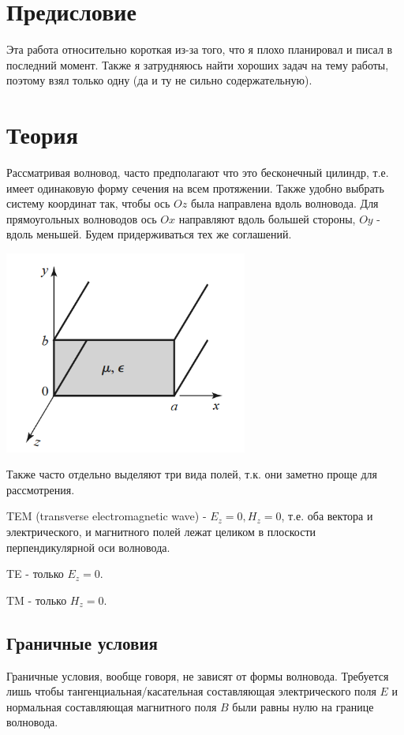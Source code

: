 \documentclass[a4paper,12pt]{article}
\numberwithin{equation}{section}
\begin{document}
\sloppy




\tableofcontents


\section{Предисловие}
Эта работа относительно короткая из-за того, что я плохо планировал и писал в последний момент.
Также я затрудняюсь найти хороших задач на тему работы, поэтому взял только одну (да и ту не сильно содержательную).

\section{Теория}
Рассматривая волновод, часто предполагают что это бесконечный цилиндр, т.е. имеет одинаковую форму сечения на всем протяжении.
Также удобно выбрать систему координат так, чтобы ось $Oz$ была направлена вдоль волновода.
Для прямоугольных волноводов ось $Ox$ направляют вдоль большей стороны, $Oy$ - вдоль меньшей.
Будем придерживаться тех же соглашений.

\begin{center}
    \includegraphics[width=8cm]{1.png}
\end{center}

Также часто отдельно выделяют три вида полей, т.к. они заметно проще для рассмотрения.

TEM (transverse electromagnetic wave) - $E_z = 0, H_z = 0$, т.е. оба вектора и электрического, и магнитного полей лежат целиком в плоскости перпендикулярной оси волновода.

TE - только $E_z = 0$.

TM - только $H_z = 0$.

\subsection{Граничные условия}
Граничные условия, вообще говоря, не зависят от формы волновода.
Требуется лишь чтобы тангенциальная/касательная составляющая электрического поля $E$ и нормальная составляющая магнитного поля $B$ были равны нулю на границе волновода.
\end{document}
